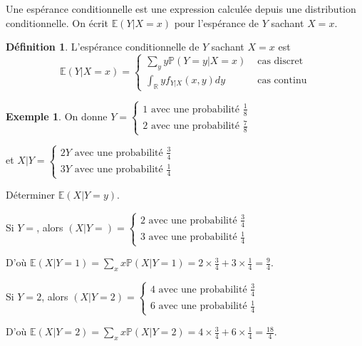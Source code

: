 \documentclass[
]{book}
\theoremstyle{definition}
\newtheorem{definition}{Définition}[chapter]
\theoremstyle{definition}
\newtheorem{example}{Exemple}[chapter]
\theoremstyle{definition}
\theoremstyle{remark}
\begin{document}
Une espérance conditionnelle est une expression calculée depuis une distribution conditionnelle. On écrit \(\mathbb{E}\left(Y|X=x \right)\) pour l'espérance de \(Y\) sachant \(X=x\).

\begin{definition}
\protect\hypertarget{def:unnamed-chunk-23}{}{\label{def:unnamed-chunk-23} }L'espérance conditionnelle de \(Y\) sachant \(X=x\) est
\[
\mathbb{E}\left(Y|X=x \right)=\left\{
\begin{array}{ll}
\displaystyle \sum_y y\mathbb{P}\left(Y=y|X=x \right) & \text{ cas discret}\\
\displaystyle \int_{\mathbb{R}}yf_{Y|X}(x,y)dy & \text{ cas continu}
\end{array}
\right.
\]
\end{definition}

\begin{example}
\protect\hypertarget{exm:exple11}{}{\label{exm:exple11} }On donne \(Y=\begin{cases}  1 \text{ avec une probabilité }\frac{1}{8}\\  2 \text{ avec une probabilité }\frac{7}{8}  \end{cases}\)

et \(X|Y=\begin{cases}  2Y \text{ avec une probabilité }\frac{3}{4}\\  3Y \text{ avec une probabilité }\frac{1}{4}  \end{cases}\)

Déterminer \(\mathbb{E}\left( X|Y=y\right)\).
\end{example}

Si \(Y=\), alors \(\left(X|Y= \right)= \begin{cases}  2 \text{ avec une probabilité }\frac{3}{4}\\  3 \text{ avec une probabilité }\frac{1}{4}  \end{cases}\)

D'où \(\mathbb{E}\left( X|Y=1\right)=\displaystyle \sum_x x\mathbb{P}\left( X|Y=1\right)=2\times\frac{3}{4}+3\times \frac{1}{4}=\frac{9}{4}\).

Si \(Y=2\), alors \(\left(X|Y=2 \right)= \begin{cases}  4 \text{ avec une probabilité }\frac{3}{4}\\  6 \text{ avec une probabilité }\frac{1}{4}  \end{cases}\)

D'où \(\mathbb{E}\left( X|Y=2\right)=\displaystyle \sum_x x\mathbb{P}\left( X|Y=2\right)=4\times\frac{3}{4}+6\times \frac{1}{4}=\frac{18}{4}\).
\end{document}
